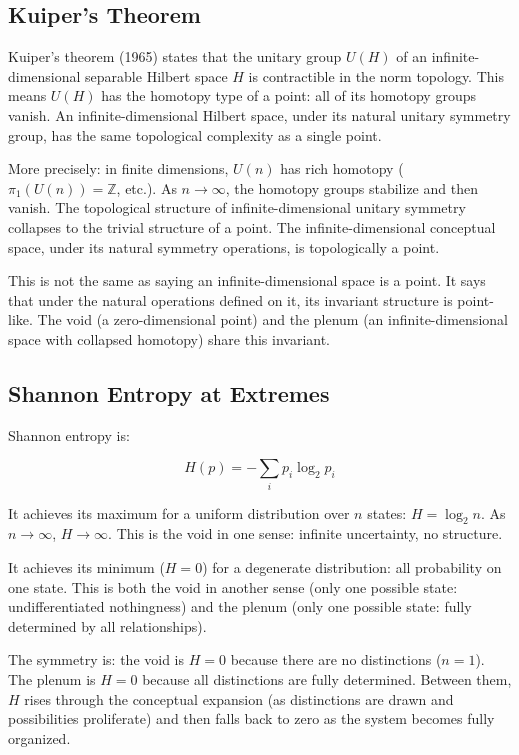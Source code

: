\documentclass[12pt]{article}
\begin{document}
\subsection{Kuiper's Theorem}\label{kuipers-theorem}

Kuiper's theorem (1965) states that the unitary group \(U(H)\) of an
infinite-dimensional separable Hilbert space \(H\) is contractible in
the norm topology. This means \(U(H)\) has the homotopy type of a point:
all of its homotopy groups vanish. An infinite-dimensional Hilbert
space, under its natural unitary symmetry group, has the same
topological complexity as a single point.

More precisely: in finite dimensions, \(U(n)\) has rich homotopy
(\(\pi_1(U(n)) = \mathbb{Z}\), etc.). As \(n \to \infty\), the homotopy
groups stabilize and then vanish. The topological structure of
infinite-dimensional unitary symmetry collapses to the trivial structure
of a point. The infinite-dimensional conceptual space, under its natural
symmetry operations, is topologically a point.

This is not the same as saying an infinite-dimensional space is a point.
It says that under the natural operations defined on it, its invariant
structure is point-like. The void (a zero-dimensional point) and the
plenum (an infinite-dimensional space with collapsed homotopy) share
this invariant.

\subsection{Shannon Entropy at Extremes}\label{shannon-entropy-at-extremes}

Shannon entropy is:

\[H(p) = -\sum_{i} p_i \log_2 p_i\]

It achieves its maximum for a uniform distribution over \(n\) states:
\(H = \log_2 n\). As \(n \to \infty\), \(H \to \infty\). This is the
void in one sense: infinite uncertainty, no structure.

It achieves its minimum (\(H = 0\)) for a degenerate distribution: all
probability on one state. This is both the void in another sense (only
one possible state: undifferentiated nothingness) and the plenum (only
one possible state: fully determined by all relationships).

The symmetry is: the void is \(H = 0\) because there are no distinctions
(\(n = 1\)). The plenum is \(H = 0\) because all distinctions are fully
determined. Between them, \(H\) rises through the conceptual expansion
(as distinctions are drawn and possibilities proliferate) and then falls
back to zero as the system becomes fully organized.
\end{document}
